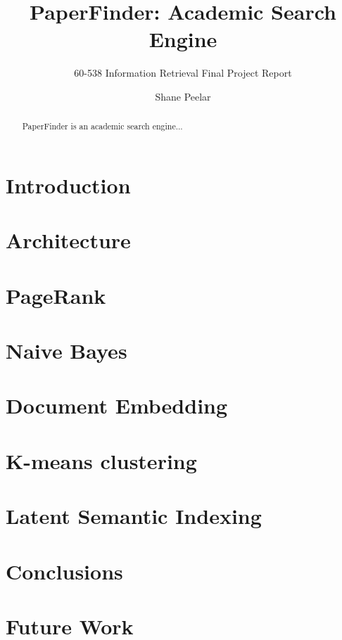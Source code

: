 \documentclass{sig-alternate}
\begin{document}
\title{PaperFinder: Academic Search Engine}
\subtitle{60-538 Information Retrieval Final Project Report}


\author{\alignauthor Shane Peelar\\}

\maketitle

\begin{abstract}
	PaperFinder is an academic search engine...
\end{abstract}

\section{Introduction}

\section{Architecture}

\section{PageRank}

\section{Naive Bayes}

\section{Document Embedding}

\section{K-means clustering}

\section{Latent Semantic Indexing}

\section{Conclusions}

\section{Future Work}
\end{document}
